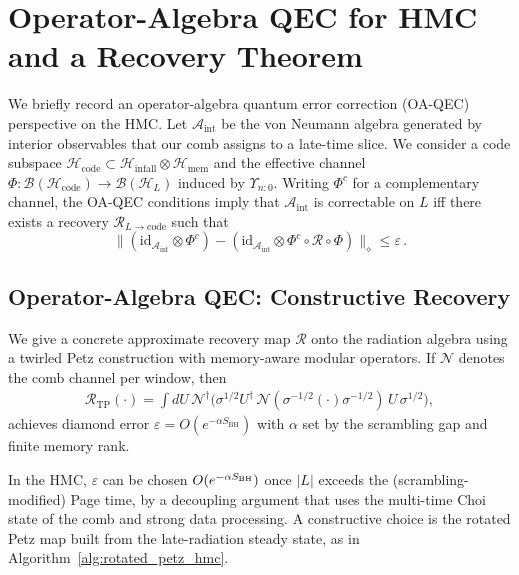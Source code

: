 \documentclass[aps,prd,preprint,onecolumn,superscriptaddress,nofootinbib,longbibliography,floatfix,11pt,showpacs,showkeys]{revtex4-2}
\newcommand{\HMC}{\textsc{HMC}\xspace}
\newcommand{\SBH}{\ensuremath{S_{\mathrm{BH}}}}
\theoremstyle{plain}
\theoremstyle{definition}
\theoremstyle{remark}
\begin{document}
\section{Operator-Algebra QEC for \HMC{} and a Recovery Theorem}
\label{app:oa_qec}
\label{app:oaqec}
We briefly record an operator-algebra quantum error correction (OA-QEC) perspective on the \HMC{}.
Let $\mathcal{A}_{\mathrm{int}}$ be the von Neumann algebra generated by interior observables that our comb assigns to a late-time slice.
We consider a code subspace $\mathcal{H}_{\mathrm{code}}\subset \mathcal{H}_{\mathrm{infall}}\otimes \mathcal{H}_{\mathrm{mem}}$ and the effective channel $\Phi:\mathcal{B}(\mathcal{H}_{\mathrm{code}})\to \mathcal{B}(\mathcal{H}_{L})$ induced by $\Upsilon_{n{:}0}$.
Writing $\Phi^{c}$ for a complementary channel, the OA-QEC conditions imply that $\mathcal{A}_{\mathrm{int}}$ is correctable on $L$ iff there exists a recovery $\mathcal{R}_{L\to \mathrm{code}}$ such that
\begin{equation}
\bigl\| (\mathrm{id}_{\mathcal{A}_{\mathrm{int}}}\otimes \Phi^{c}) - (\mathrm{id}_{\mathcal{A}_{\mathrm{int}}}\otimes \Phi^{c}\circ \mathcal{R}\circ \Phi) \bigr\|_{\diamond} \le \varepsilon\,.
\end{equation}

\subsection{Operator-Algebra QEC: Constructive Recovery}
We give a concrete approximate recovery map $\mathcal{R}$ onto the radiation algebra using a twirled Petz construction with memory-aware modular operators. If $\mathcal{N}$ denotes the comb channel per window, then
\begin{align}
\mathcal{R}_{\mathrm{TP}}(\cdot)=\int dU\, \mathcal{N}^\dagger\!\big(\sigma^{1/2} U^\dagger\, \mathcal{N}(\sigma^{-1/2} (\cdot) \sigma^{-1/2})\,U\,\sigma^{1/2}\big),
\end{align}
achieves diamond error $\varepsilon=O(e^{-\alpha \SBH})$ with $\alpha$ set by the scrambling gap and finite memory rank. 

In the \HMC{}, $\varepsilon$ can be chosen $O(e^{-\alpha S_{\rm BH}})$ once $|L|$ exceeds the (scrambling-modified) Page time, by a decoupling argument that uses the multi-time Choi state of the comb and strong data processing.
A constructive choice is the rotated Petz map built from the late-radiation steady state, as in Algorithm~\ref{alg:rotated_petz_hmc}.
\end{document}
